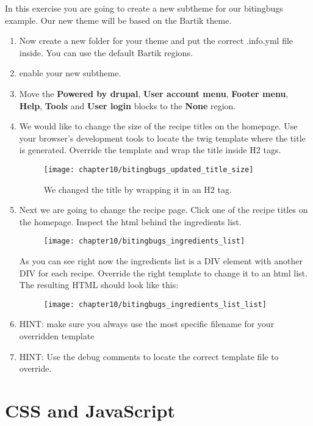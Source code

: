In this exercise you are going to create a new subtheme for our bitingbugs example. Our new theme will be based on the Bartik theme.
\begin{enumerate}
	\item Now create a new folder for your theme and put the correct .info.yml file inside. You can use the default Bartik regions.
	\item enable your new subtheme.
	\item Move the \textbf{Powered by drupal}, \textbf{User account menu}, \textbf{Footer menu}, \textbf{Help}, \textbf{Tools} and \textbf{User login} blocks to the \textbf{None} region.
	\item We would like to change the size of the recipe titles on the homepage. Use your browser's development tools to locate the twig template where the title is generated. Override the template and wrap the title inside H2 tags.
	\begin{figure}[H]
		\centering
		\texttt{[image: chapter10/bitingbugs\_updated\_title\_size]}
		\caption{We changed the title by wrapping it in an H2 tag.}
		\label{fig:bitingbugs_updated_title_size}
	\end{figure}
	\item Next we are going to change the recipe page. Click one of the recipe titles on the homepage. Inspect the html behind the ingredients list. 
	\begin{figure}[H]
		\centering
		\texttt{[image: chapter10/bitingbugs\_ingredients\_list]}
		\label{fig:bitingbugs_ingredients_list}
	\end{figure}
	As you can see right now the ingredients list is a DIV element with another DIV for each recipe. Override the right template to change it to an html list. The resulting HTML should look like this:
	\begin{figure}[H]
		\centering
		\texttt{[image: chapter10/bitingbugs\_ingredients\_list\_list]}
		\label{fig:bitingbugs_ingredients_list_list}
	\end{figure}
	\item HINT: make sure you always use the most specific filename for your overridden template
	\item HINT: Use the debug comments to locate the correct template file to override.
\end{enumerate}


\section{CSS and JavaScript}
























